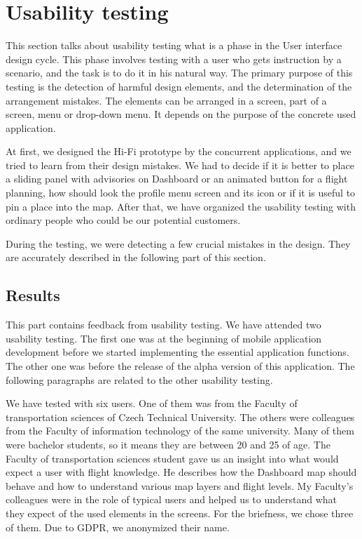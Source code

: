 \section{Usability testing}\label{sec:usability-testing}

This section talks about usability testing what is a phase in the User interface design cycle.
This phase involves testing with a user who gets instruction by a scenario, and the task is to do it in his natural way.
The primary purpose of this testing is the detection of harmful design elements, and the determination of the arrangement mistakes.
The elements can be arranged in a screen, part of a screen, menu or drop-down menu.
It depends on the purpose of the concrete used application.

At first, we designed the Hi-Fi prototype by the concurrent applications, and we tried to learn from their design mistakes.
We had to decide if it is better to place a sliding panel with advisories on Dashboard or an animated button for a flight planning, how should look the profile menu screen and its icon or if it is useful to pin a place into the map.
After that, we have organized the usability testing with ordinary people who could be our potential customers.

During the testing, we were detecting a few crucial mistakes in the design.
They are accurately described in the following part of this section.

\subsection{Results}\label{subsec:results}
This part contains feedback from usability testing.
We have attended two usability testing.
The first one was at the beginning of mobile application development before we started implementing the essential application functions.
The other one was before the release of the alpha version of this application.
The following paragraphs are related to the other usability testing.

We have tested with six users.
One of them was from the Faculty of transportation sciences of Czech Technical University.
The others were colleagues from the Faculty of information technology of the same university.
Many of them were bachelor students, so it means they are between 20 and 25 of age.
The Faculty of transportation sciences student gave us an insight into what would expect a user with flight knowledge.
He describes how the Dashboard map should behave and how to understand various map layers and flight levels.
My Faculty’s colleagues were in the role of typical users and helped us to understand what they expect of the used elements in the screens.
For the briefness, we chose three of them.
Due to GDPR, we anonymized their name.

